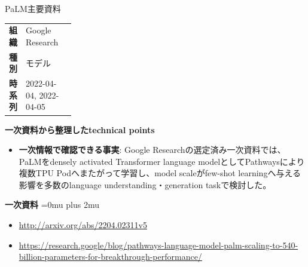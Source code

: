 \begin{technicalnote}{PaLM}{主要資料}
\begingroup
\begin{tabularx}{\linewidth}{@{}>{\bfseries}p{0.22\linewidth}X@{}}
組織 & Google Research \\
種別 & モデル \\
時系列 & 2022-04-04, 2022-04-05 \\
\end{tabularx}
\smallskip
{\bfseries 一次資料から整理したtechnical points}
\begin{itemize}[leftmargin=1.5em,itemsep=0.35em]
\item \textbf{一次情報で確認できる事実}: Google Researchの選定済み一次資料では、PaLMをdensely activated Transformer language modelとしてPathwaysにより複数TPU Podへまたがって学習し、model scaleがfew-shot learningへ与える影響を多数のlanguage understanding・generation taskで検討した。
\end{itemize}
\begin{minipage}{\linewidth}
\begin{samepage}
{\bfseries 一次資料}
\begingroup\sloppy
\Urlmuskip=0mu plus 2mu\relax
\begin{itemize}[leftmargin=1.5em,itemsep=0.25em]
\item {\scriptsize\url{http://arxiv.org/abs/2204.02311v5}}
\item {\scriptsize\url{https://research.google/blog/pathways-language-model-palm-scaling-to-540-billion-parameters-for-breakthrough-performance/}}
\end{itemize}
\endgroup
\end{samepage}
\end{minipage}
\endgroup
\end{technicalnote}
\medskip

